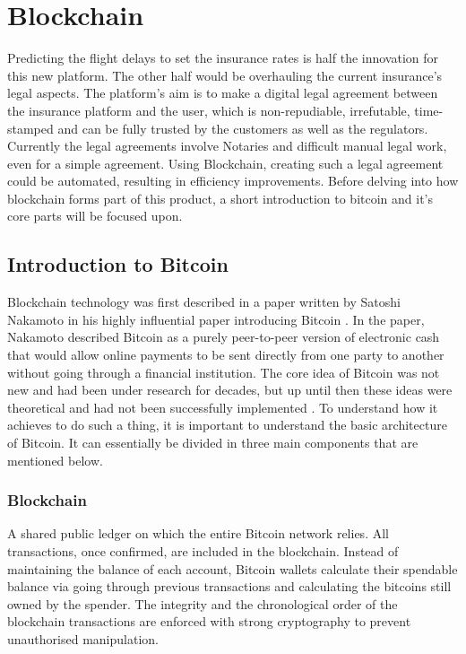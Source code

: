\chapter{Blockchain}

Predicting the flight delays to set the insurance rates is half the innovation for this new platform. The other half would be overhauling the current insurance's legal aspects. The platform's aim is to make a digital legal agreement between the insurance platform and the user, which is non-repudiable, irrefutable, time-stamped and can be fully trusted by the customers as well as the regulators. Currently the legal agreements involve Notaries and difficult manual legal work, even for a simple agreement. Using Blockchain, creating such a legal agreement could be automated, resulting in efficiency improvements. Before delving into how blockchain forms part of this product, a short introduction to bitcoin and it's core parts will be focused upon. 

\section{Introduction to Bitcoin}
Blockchain technology was first described in a paper written by Satoshi Nakamoto in his highly influential paper introducing Bitcoin \cite{Nakamoto2008Bitcoin:System}. In the paper, Nakamoto described Bitcoin as a purely peer-to-peer version of electronic cash that would allow online payments to be sent directly from one party to another without going through a financial institution. The core idea of Bitcoin was not new and had been under research for decades, but up until then these ideas were theoretical and had not been successfully implemented \cite{Chaum1983BlindPayments}. To understand how it achieves to do such a thing, it is important to understand the basic architecture of Bitcoin. It can essentially be divided in three main components that are mentioned below\cite{Economist2013HowWork}.

\subsection{Blockchain}
A shared public ledger on which the entire Bitcoin network relies. All transactions, once confirmed, are included in the blockchain. Instead of maintaining the balance of each account, Bitcoin wallets calculate their spendable balance via going through previous transactions and calculating the bitcoins  still owned by the spender. The integrity and the chronological order of the blockchain transactions are enforced with strong cryptography to prevent unauthorised manipulation. 

